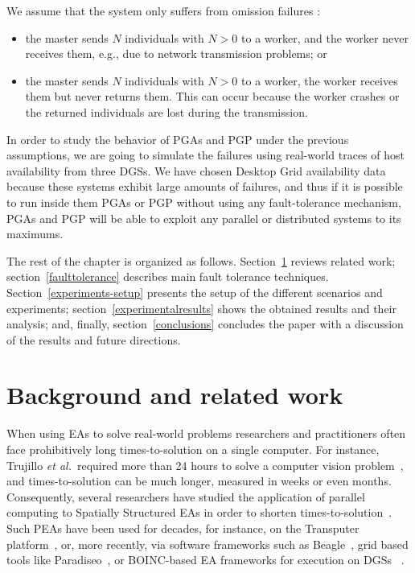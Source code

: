 \documentclass[graybox]{sty/svmult}
\begin{document}
We assume that the system only suffers from omission failures \cite{distributed-systems}: 
\begin{itemize}
    \item the master sends $N$ individuals with $N>0$ to a worker, and the worker never receives them,
e.g., due to network transmission problems; or
    \item the master sends $N$ individuals with $N>0$ to a worker, the worker receives them but never
returns them. This can occur because the worker crashes or the returned individuals are lost during the transmission.
\end{itemize}   

In order to study the behavior of PGAs and PGP under the previous assumptions, we are going to simulate the failures using 
real-world traces of host availability from three DGSs. We have chosen Desktop Grid availability data because these systems
exhibit large amounts of failures, and thus if it is possible to run inside them PGAs or PGP without using any fault-tolerance
mechanism, PGAs and PGP will be able to exploit any parallel or distributed systems to its maximums.

The rest of the chapter is organized as follows. Section~\ref{related-work} reviews related
work; section~\ref{faulttolerance} describes main fault tolerance techniques.
Section~\ref{experiments-setup} presents the setup of the different
scenarios and experiments; 
section~\ref{experimentalresults} shows the obtained results and their
analysis; and, finally, section~\ref{conclusions} concludes the paper with a discussion of the results and future directions.

\section{Background and related work}
\label{related-work}

When using EAs to solve real-world problems researchers and practitioners often face prohibitively
long times-to-solution on a single computer.  For instance,
Trujillo \emph{et al.}~required more than 24 hours to solve a computer
vision problem~\cite{ipgp2}, and times-to-solution can be
much longer, measured in weeks or even months. Consequently,
several researchers have studied the application of parallel
computing to Spatially Structured EAs in order to shorten
times-to-solution~\cite{Fernandez:PGP, spatially-structured-EAs, parallel-ga-survey}.
Such PEAs have been used for decades, for instance, on the Transputer
platform~\cite{transputer}, or, more recently, via software frameworks
such as Beagle~\cite{master-slave-framework-beagle}, grid based tools
like Paradiseo~\cite{grid-parallel-bioinspired-algorithms}, or BOINC-based EA frameworks for
execution on DGSs ~\cite{vmware-boinc-ipgp}.
\end{document}
